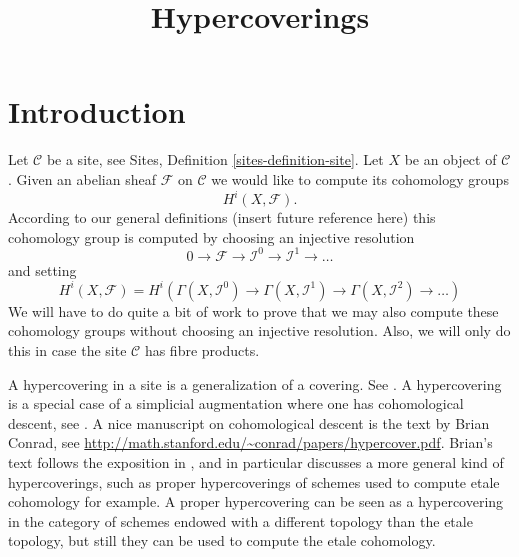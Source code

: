 

%


\title{Hypercoverings}


\maketitle

\tableofcontents

\section{Introduction}
\label{section-introduction}

\noindent
Let $\mathcal{C}$ be a site, see Sites, Definition \ref{sites-definition-site}.
Let $X$ be an object of $\mathcal{C}$.
Given an abelian sheaf $\mathcal{F}$
on $\mathcal{C}$ we would like to compute
its cohomology groups
$$
H^i(X, \mathcal{F}).
$$
According to our general definitions
(insert future reference here)
this cohomology group is computed by
choosing an injective resolution
$$
0 \to \mathcal{F} \to \mathcal{I}^0 \to \mathcal{I}^1 \to \ldots
$$
and setting
$$
H^i(X, \mathcal{F})
=
H^i(
\Gamma(X, \mathcal{I}^0) \to
\Gamma(X, \mathcal{I}^1) \to
\Gamma(X, \mathcal{I}^2)\to \ldots)
$$
We will have to do quite a bit of work to prove that we
may also compute these cohomology groups without
choosing an injective resolution. Also, we will only do this
in case the site $\mathcal{C}$ has fibre products.

\medskip\noindent
A hypercovering in a site is a generalization of a covering.
See \cite[Expose V, Sec. 7]{SGA4}. A hypercovering is a special
case of a simplicial augmentation where one has cohomological
descent, see \cite[Expose Vbis]{SGA4}. A nice manuscript on
cohomological descent is the text by Brian Conrad, see
\url{http://math.stanford.edu/~conrad/papers/hypercover.pdf}.
Brian's text follows the exposition in \cite[Expose Vbis]{SGA4}, and in
particular discusses a more general kind of hypercoverings, such as
proper hypercoverings of schemes used to compute etale cohomology
for example. A proper hypercovering can be seen as a hypercovering
in the category of schemes endowed with a different topology than
the etale topology, but still they can be used to compute the etale
cohomology.





























